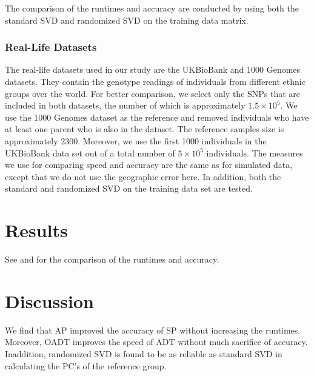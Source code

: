 \documentclass{article}
\begin{document}
The comparison of the runtimes and accuracy are conducted by using both the
standard SVD and randomized SVD on the training data matrix.

\subsubsection{Real-Life Datasets}

The real-life datasets used in our study are the UKBioBank and 1000 Genomes datasets.
They contain the genotype readings of individuals from different ethnic groups over the world.
For better comparison, we select only the SNPs that are included in both datasets,
the number of which is approximately $1.5 \times 10^5$.
We use the 1000 Genomes dataset as the reference and removed individuals who have at least one parent who is also in the dataset.
The reference samples size is approximately $2300$.
Moreover, we use the first 1000 individuals in the UKBioBank data set out of a
total number of $5 \times 10^5$ individuals. 
The measures we use for comparing speed and accuracy are the same as for
simulated data,
except that we do not use the geographic error here.
In addition, both the standard and randomized SVD on the training data set are tested.



\section{Results}

See  and  for the comparison of the runtimes and accuracy.



\section{Discussion}

We find that AP improved the accuracy of SP without increasing the runtimes.
Moreover, OADT improves the speed of ADT without much sacrifice of accuracy.
Inaddition, randomized SVD is found to be as reliable as standard SVD in
calculating the PC's of the reference group.

\newpage
\end{document}
